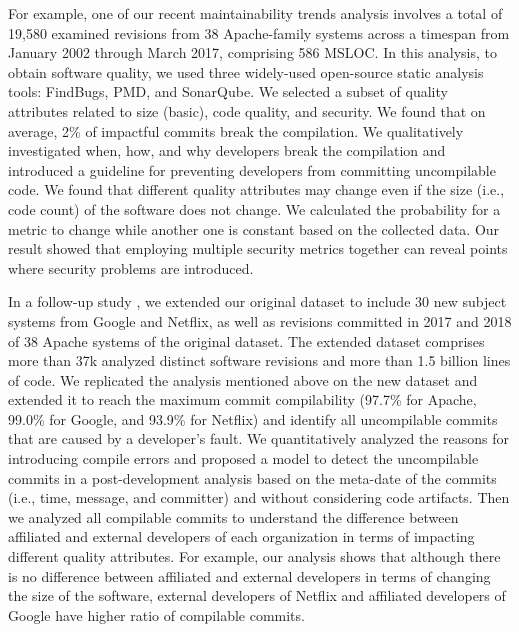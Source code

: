 
For example,
one of our recent maintainability trends analysis \cite{Behnamghader2017qrs} involves a total of 19,580 examined revisions from 38 Apache-family systems across a timespan from January 2002 through March 2017, comprising 586 MSLOC.
In this analysis, to obtain software quality, we used three widely-used open-source static analysis tools: FindBugs, PMD, and SonarQube.
We selected a subset of quality attributes related to size (basic), code quality, and security.
We found that on average, 2\% of impactful commits break the compilation.
We qualitatively investigated when, how, and why developers break the compilation and introduced a guideline for preventing developers from committing uncompilable code.
We found that different quality attributes may change even if the size (i.e., code count) of the software does not change.
We calculated the probability for a metric to change while another one is constant based on the collected data.
Our result showed that employing multiple security metrics together can reveal points where security problems are introduced.

In a follow-up study \cite{Behnamghader2018esem}, we extended our original dataset to include 30 new subject systems from Google and Netflix, as well as revisions committed in 2017 and 2018 of 38 Apache systems of the original dataset.
The extended dataset comprises more than 37k analyzed distinct software revisions and more than 1.5 billion lines of code.
We replicated the analysis mentioned above on the new dataset and extended it to reach the maximum commit compilability (97.7\% for Apache, 99.0\% for Google, and 93.9\% for Netflix) and identify all uncompilable commits that are caused by a developer's fault.
We quantitatively analyzed the reasons for introducing compile errors and proposed a model to detect the uncompilable commits in a post-development analysis based on the meta-date of the commits (i.e., time, message, and committer) and without considering code artifacts.
Then we analyzed all compilable commits to understand the difference between affiliated and external developers of each organization in terms of impacting different quality attributes. 
For example, our analysis shows that although there is no difference between affiliated and external developers in terms of changing the size of the software, external developers of Netflix and affiliated developers of Google have higher ratio of compilable commits.

